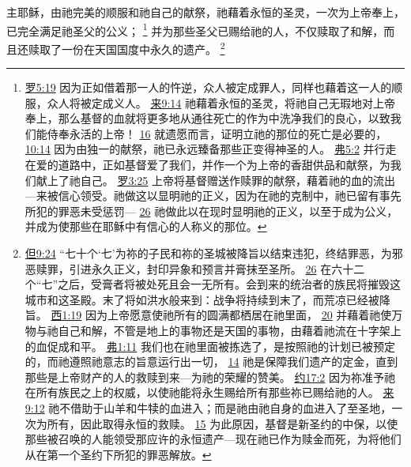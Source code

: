 \documentclass[12pt, a4paper, oneside]{ctexart}
\newcounter{parnum}[section]
\newcommand{\N}{%
   \noindent\refstepcounter{parnum}%
    \makebox[\parindent][l]{\textbf{\arabic{parnum}.}}}
\begin{document}
\N 主耶稣，由祂完美的顺服和祂自己的献祭，祂藉着永恒的圣灵，一次为上帝奉上，已完全满足祂圣父的公义；
	\footnote {
		\href{https://biblehub.com/romans/5-19.htm}{罗5:19} 因为正如借着那一人的忤逆，众人被定成罪人，同样也藉着这一人的顺服，众人将被定成义人。
		\href{https://biblehub.com/hebrews/9-14.htm}{来9:14} 祂藉着永恒的圣灵，将祂自己无瑕地对上帝奉上，那么基督的血就将更多地从通往死亡的作为中洗净我们的良心，以致我们能侍奉永活的上帝！
		\href{https://biblehub.com/hebrews/9-16.htm}{16} 就遗愿而言，证明立祂的那位的死亡是必要的，
		\href{https://biblehub.com/hebrews/10-14.htm}{10:14} 因为由独一的献祭，祂已永远臻备那些正变得神圣的人。
		\href{https://biblehub.com/ephesians/5-2.htm}{弗5:2} 并行走在爱的道路中，正如基督爱了我们，并作一个为上帝的香甜供品和献祭，为我们献上了祂自己。
		\href{https://biblehub.com/romans/3-25.htm}{罗3:25} 上帝将基督赠送作赎罪的献祭，藉着祂的血的流出---来被信心领受。祂做这以显明祂的正义，因为在祂的克制中，祂已留有事先所犯的罪恶未受惩罚---
		\href{https://biblehub.com/romans/3-26.htm}{26} 祂做此以在现时显明祂的正义，以至于成为公义，并成为使那些在耶稣中有信心的人称义的那位。
	}
	并为那些圣父已赐给祂的人，不仅赎取了和解，而且还赎取了一份在天国国度中永久的遗产。
	\footnote {
		\href{https://biblehub.com/daniel/9-24.htm}{但9:24} “七十个‘七’为祢的子民和祢的圣城被降旨以结束违犯，终结罪恶，为邪恶赎罪，引进永久正义，封印异象和预言并膏抹至圣所。
		\href{https://biblehub.com/daniel/9-26.htm}{26} 在六十二个“七”之后，受膏者将被处死且会一无所有。会到来的统治者的族民将摧毁这城市和这圣殿。末了将如洪水般来到：战争将持续到末了，而荒凉已经被降旨。
		\href{https://biblehub.com/colossians/1-19.htm}{西1:19} 因为上帝愿意使祂所有的圆满都栖居在祂里面，
		\href{https://biblehub.com/colossians/1-20.htm}{20} 并藉着祂使万物与祂自己和解，不管是地上的事物还是天国的事物，由藉着祂流在十字架上的血促成和平。
		\href{https://biblehub.com/ephesians/1-11.htm}{弗1:11} 我们也在祂里面被拣选了，是按照祂的计划已被预定的，而祂遵照祂意志的旨意运行出一切，
		\href{https://biblehub.com/ephesians/1-14.htm}{14} 祂是保障我们遗产的定金，直到那些是上帝财产的人的救赎到来---为祂的荣耀的赞美。
		\href{https://biblehub.com/john/17-2.htm}{约17:2} 因为祢准予祂在所有族民之上的权威，以使祂能将永生赐给所有那些祢已赐给祂的人。
		\href{https://biblehub.com/hebrews/9-12.htm}{来9:12} 祂不借助于山羊和牛犊的血进入；而是祂由祂自身的血进入了至圣地，一次为所有，因此取得永恒的救赎。
		\href{https://biblehub.com/hebrews/9-15.htm}{15} 为此原因，基督是新圣约的中保，以使那些被召唤的人能领受那应许的永恒遗产---现在祂已作为赎金而死，为将他们从在第一个圣约下所犯的罪恶解放。
	}
\end{document}
